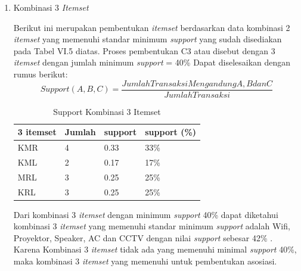 \begin{enumerate}
\item Kombinasi 3 \textit{Itemset}
\par Berikut ini merupakan pembentukan  \textit{itemset} berdasarkan data kombinasi 2 \textit{itemset}  yang memenuhi standar minimum \textit{support} yang sudah disediakan pada Tabel VI.5 diatas. Proses pembentukan C3 atau disebut dengan 3 \textit{itemset} dengan jumlah minimum \textit{support} = 40\% Dapat diselesaikan dengan rumus berikut:
\begin{equation}
Support (A,B,C) =\frac{Jumlah Transaksi Mengandung A,B dan C}{Jumlah Transaksi} 
\end{equation}
\begin{table}[!ht]
\caption{Support Kombinasi 3 Itemset}
\centering
\begin{tabular}{|l|l|l|l|}
\hline
3 itemset & Jumlah & support & support (\%) \\ \hline
KMR       & 4      & 0.33    & 33\%         \\ \hline
KML       & 2      & 0.17    & 17\%         \\ \hline
MRL       & 3      & 0.25    & 25\%         \\ \hline
KRL       & 3      & 0.25    & 25\%         \\ \hline
\end{tabular}
\end{table}

\par Dari kombinasi 3 \textit{itemset} dengan minimum \textit{support} 40\% dapat diketahui kombinasi 3 \textit{itemset} yang memenuhi standar minimum \textit{support} adalah Wifi, Proyektor, Speaker, AC dan CCTV dengan nilai \textit{support} sebesar 42\% . Karena Kombinasi 3 \textit{itemset} tidak ada yang memenuhi minimal \textit{support} 40\%, maka kombinasi 3 \textit{itemset} yang memenuhi untuk pembentukan asosiasi.
\end{enumerate}

